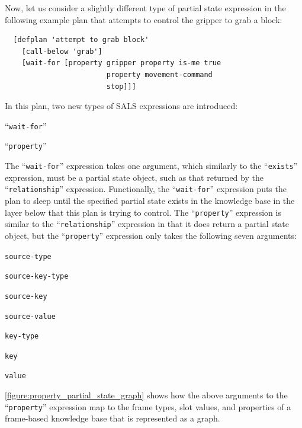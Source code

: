Now, let us consider a slightly different type of partial state
expression in the following example plan that attempts to control the
gripper to grab a block:
\begin{samepage}
\begin{Verbatim}
  [defplan 'attempt to grab block'
    [call-below 'grab']
    [wait-for [property gripper property is-me true
                        property movement-command
                        stop]]]
\end{Verbatim}
\end{samepage}
In this plan, two new types of SALS expressions are introduced:
\begin{packed_itemize}
\item{``{\tt{wait-for}}''}
\item{``{\tt{property}}''}
\end{packed_itemize}
The ``{\tt{wait-for}}'' expression takes one argument, which similarly
to the ``{\tt{exists}}'' expression, must be a partial state object,
such as that returned by the ``{\tt{relationship}}'' expression.
Functionally, the ``{\tt{wait-for}}'' expression puts the plan to
sleep until the specified partial state exists in the knowledge base
in the layer below that this plan is trying to control.  The
``{\tt{property}}'' expression is similar to the
``{\tt{relationship}}'' expression in that it does return a partial
state object, but the ``{\tt{property}}'' expression only takes the
following seven arguments:
\begin{packed_enumerate}
\item{{\tt{source-type}}}
\item{{\tt{source-key-type}}}
\item{{\tt{source-key}}}
\item{{\tt{source-value}}}
\item{{\tt{key-type}}}
\item{{\tt{key}}}
\item{{\tt{value}}}
\end{packed_enumerate}
{\mbox{\autoref{figure:property_partial_state_graph}}} shows how the
above arguments to the ``{\tt{property}}'' expression map to the frame
types, slot values, and properties of a frame-based knowledge base
that is represented as a graph.
